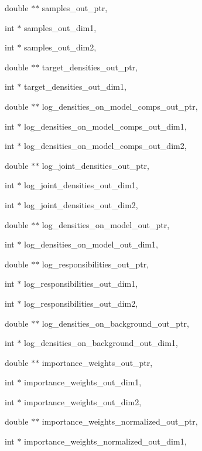 {\begin{DoxyParamCaption}
\item[{double $\ast$$\ast$}]{samples\+\_\+out\+\_\+ptr, }
\item[{int $\ast$}]{samples\+\_\+out\+\_\+dim1, }
\item[{int $\ast$}]{samples\+\_\+out\+\_\+dim2, }
\item[{double $\ast$$\ast$}]{target\+\_\+densities\+\_\+out\+\_\+ptr, }
\item[{int $\ast$}]{target\+\_\+densities\+\_\+out\+\_\+dim1, }
\item[{double $\ast$$\ast$}]{log\+\_\+densities\+\_\+on\+\_\+model\+\_\+comps\+\_\+out\+\_\+ptr, }
\item[{int $\ast$}]{log\+\_\+densities\+\_\+on\+\_\+model\+\_\+comps\+\_\+out\+\_\+dim1, }
\item[{int $\ast$}]{log\+\_\+densities\+\_\+on\+\_\+model\+\_\+comps\+\_\+out\+\_\+dim2, }
\item[{double $\ast$$\ast$}]{log\+\_\+joint\+\_\+densities\+\_\+out\+\_\+ptr, }
\item[{int $\ast$}]{log\+\_\+joint\+\_\+densities\+\_\+out\+\_\+dim1, }
\item[{int $\ast$}]{log\+\_\+joint\+\_\+densities\+\_\+out\+\_\+dim2, }
\item[{double $\ast$$\ast$}]{log\+\_\+densities\+\_\+on\+\_\+model\+\_\+out\+\_\+ptr, }
\item[{int $\ast$}]{log\+\_\+densities\+\_\+on\+\_\+model\+\_\+out\+\_\+dim1, }
\item[{double $\ast$$\ast$}]{log\+\_\+responsibilities\+\_\+out\+\_\+ptr, }
\item[{int $\ast$}]{log\+\_\+responsibilities\+\_\+out\+\_\+dim1, }
\item[{int $\ast$}]{log\+\_\+responsibilities\+\_\+out\+\_\+dim2, }
\item[{double $\ast$$\ast$}]{log\+\_\+densities\+\_\+on\+\_\+background\+\_\+out\+\_\+ptr, }
\item[{int $\ast$}]{log\+\_\+densities\+\_\+on\+\_\+background\+\_\+out\+\_\+dim1, }
\item[{double $\ast$$\ast$}]{importance\+\_\+weights\+\_\+out\+\_\+ptr, }
\item[{int $\ast$}]{importance\+\_\+weights\+\_\+out\+\_\+dim1, }
\item[{int $\ast$}]{importance\+\_\+weights\+\_\+out\+\_\+dim2, }
\item[{double $\ast$$\ast$}]{importance\+\_\+weights\+\_\+normalized\+\_\+out\+\_\+ptr, }
\item[{int $\ast$}]{importance\+\_\+weights\+\_\+normalized\+\_\+out\+\_\+dim1, }

\end{DoxyParamCaption}}
